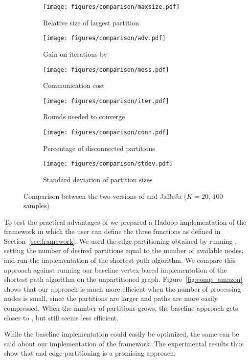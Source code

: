 \begin{figure*}
\setlength{\belowcaptionskip}{-5pt}

\begin{center}
\begin{subfigure}[b]{0.3\textwidth}
\texttt{[image: figures/comparison/maxsize.pdf]}
\caption{Relative size of largest partition}
\label{}
\end{subfigure}
\begin{subfigure}[b]{0.3\textwidth}
\texttt{[image: figures/comparison/adv.pdf]}
\caption{Gain on iterations by \etsch}
\label{}
\end{subfigure}
\begin{subfigure}[b]{0.3\textwidth}
\texttt{[image: figures/comparison/mess.pdf]}
\caption{Communication cost}
\label{}
\end{subfigure}
\end{center}


\vspace{-8pt}
\begin{center}
\begin{subfigure}[b]{0.3\textwidth}
\texttt{[image: figures/comparison/iter.pdf]}
\caption{Rounds needed to converge}
\label{}
\end{subfigure}
\begin{subfigure}[b]{0.3\textwidth}
\texttt{[image: figures/comparison/conn.pdf]}
\caption{Percentage of disconnected partitions}
\label{}
\end{subfigure}
\begin{subfigure}[b]{0.3\textwidth}
\texttt{[image: figures/comparison/stdev.pdf]}
\caption{Standard deviation of partition sizes}
\label{}
\end{subfigure}
\end{center}


\caption{Comparison between the two versions of \dfep and JaBeJa ($K=20$, $100$ samples)}
\label{fig:comparison}
\end{figure*}

To test the practical advantages of \etsch we prepared a Hadoop implementation
of the framework in which the user can define the three functions as defined in
Section~\ref{sec:framework}. We used the edge-partitioning obtained by running
\dfep, setting the number of desired partitions equal to the number of
available nodes, and run the \etsch implementation of the shortest path
algorithm. We compare this approach against running our baseline vertex-based
implementation of the shortest path algorithm on the unpartitioned graph.
Figure~\ref{fig:comp_amazon} shows that our approach is much more efficient
when the number of processing nodes is small, since the partitions are larger
and paths are more easily compressed. When the number of partitions grows, the
baseline approach gets closer to \etsch, but still seems less efficient.

While the baseline implementation could easily be optimized, the same can be
said about our implementation of the \etsch framework.
The experimental results thus show that \etsch and edge-partitioning is a 
promising approach.



